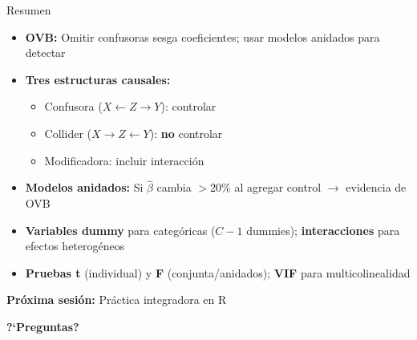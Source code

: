 \documentclass[aspectratio=169,11pt]{beamer}
\newcommand{\highlight}[1]{\textcolor{uddlight}{\bfseries #1}}
\begin{document}
\begin{frame}{Resumen}
\small
\begin{itemize}
    \setlength{\itemsep}{4pt}
    \item \textbf{OVB:} Omitir confusoras sesga coeficientes; usar modelos anidados para detectar

    \item \textbf{Tres estructuras causales:}
    \begin{itemize}
        \small
        \item Confusora ($X \leftarrow Z \rightarrow Y$): controlar
        \item Collider ($X \rightarrow Z \leftarrow Y$): \textbf{no} controlar
        \item Modificadora: incluir interacci\'on
    \end{itemize}

    \item \textbf{Modelos anidados:} Si $\hat{\beta}$ cambia $>$20\% al agregar control $\rightarrow$ evidencia de OVB

    \item \textbf{Variables dummy} para categ\'oricas ($C-1$ dummies); \textbf{interacciones} para efectos heterog\'eneos

    \item \textbf{Pruebas t} (individual) y \textbf{F} (conjunta/anidados); \textbf{VIF} para multicolinealidad
\end{itemize}

\vspace{0.3cm}
\textbf{Pr\'oxima sesi\'on:} Pr\'actica integradora en R

\vspace{0.3cm}
\centering
\Large \highlight{?`Preguntas?}
\end{frame}
\end{document}
